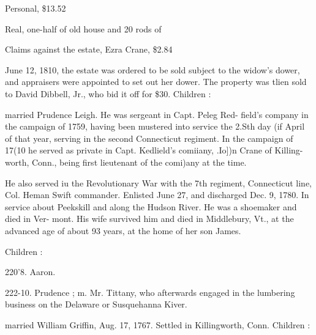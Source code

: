 \documentclass{book}
\begin{document}
Personal, \$13.52 

Real, one-half of old house and 20 rods of 



Claims against the estate, Ezra Crane, \$2.84 

June 12, 1810, the estate was ordered to be sold subject to the 
widow's dower, and appraisers were appointed to set out her 
dower. The property was tlien sold to David Dibbell, Jr., who 
bid it off for \$30. Children : 









married Prudence Leigh. He was sergeant in Capt. Peleg Red- 
field's company in the campaign of 1759, having been mustered 
into service the 2.Sth day (if April of that year, serving in the 
second Connecticut regiment. In the campaign of 17(10 he served 
as private in Capt. Kedlield's comiiany, .Io])n Crane of Killing- 
worth, Conn., being first lieutenant of the comi)any at the time. 




He also served iu the Revolutionary War with the 7th regiment, 
Connecticut line, Col. Heman Swift commander. Enlisted June 
27, and discharged Dec. 9, 1780. In service about Peekskill and 
along the Hudson River. He was a shoemaker and died in Ver- 
mont. His wife survived him and died in Middlebury, Vt., at 
the advanced age of about 93 years, at the home of her son James. 

Children : 








220'8. Aaron. 


222-10. Prudence ; m. Mr. Tittany, who afterwards engaged in the 
lumbering business on the Delaware or Susquehanna Kiver. 


married William Griffin, Aug. 17, 1767. Settled in Killingworth, 
Conn. Children : 
\end{document}
